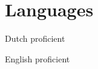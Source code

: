 \section*{Languages}

	\begin{languageList}
		\item[Dutch] proficient
		\item[English] proficient
	\end{languageList}
